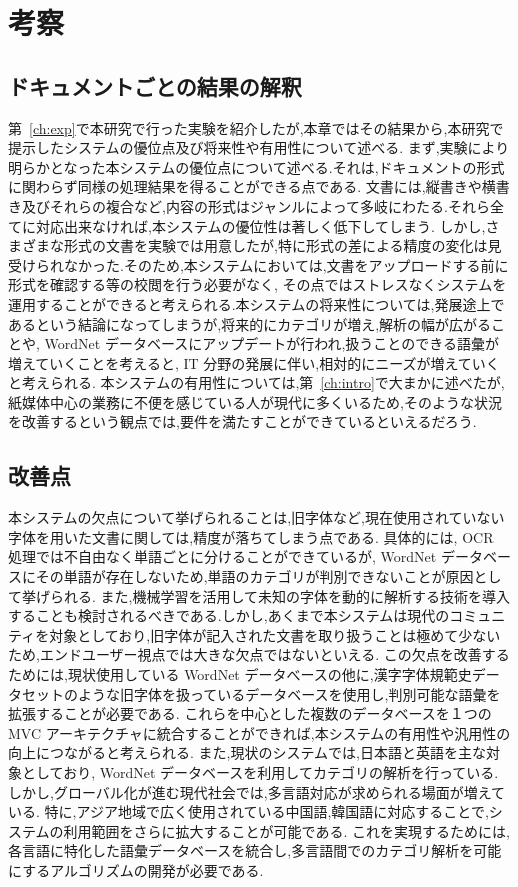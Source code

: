 \chapter{考察}
\label{ch:eval}

\quad

\section{ドキュメントごとの結果の解釈}
\label{sec:eval_docs}

第~\ref{ch:exp}で本研究で行った実験を紹介したが,本章ではその結果から,本研究で提示したシステムの優位点及び将来性や有用性について述べる.
まず,実験により明らかとなった本システムの優位点について述べる.それは,ドキュメントの形式に関わらず同様の処理結果を得ることができる点である.
文書には,縦書きや横書き及びそれらの複合など,内容の形式はジャンルによって多岐にわたる.それら全てに対応出来なければ,本システムの優位性は著しく低下してしまう.
しかし,さまざまな形式の文書を実験では用意したが,特に形式の差による精度の変化は見受けられなかった.そのため,本システムにおいては,文書をアップロードする前に形式を確認する等の校閲を行う必要がなく,
その点ではストレスなくシステムを運用することができると考えられる.本システムの将来性については,発展途上であるという結論になってしまうが,将来的にカテゴリが増え,解析の幅が広がることや,
WordNet データベースにアップデートが行われ,扱うことのできる語彙が増えていくことを考えると, IT 分野の発展に伴い,相対的にニーズが増えていくと考えられる.
本システムの有用性については,第~\ref{ch:intro}で大まかに述べたが,紙媒体中心の業務に不便を感じている人が現代に多くいるため,そのような状況を改善するという観点では,要件を満たすことができているといえるだろう.

\section{改善点}
\label{sec:eval_improve}
本システムの欠点について挙げられることは,旧字体など,現在使用されていない字体を用いた文書に関しては,精度が落ちてしまう点である.
具体的には, OCR 処理では不自由なく単語ごとに分けることができているが, WordNet データベースにその単語が存在しないため,単語のカテゴリが判別できないことが原因として挙げられる.
また,機械学習を活用して未知の字体を動的に解析する技術を導入することも検討されるべきである.しかし,あくまで本システムは現代のコミュニティを対象としており,旧字体が記入された文書を取り扱うことは極めて少ないため,エンドユーザー視点では大きな欠点ではないといえる.
この欠点を改善するためには,現状使用している WordNet データべースの他に,漢字字体規範史データセットのような旧字体を扱っているデータベースを使用し,判別可能な語彙を拡張することが必要である.
これらを中心とした複数のデータベースを１つの MVC アーキテクチャに統合することができれば,本システムの有用性や汎用性の向上につながると考えられる.
また,現状のシステムでは,日本語と英語を主な対象としており, WordNet データベースを利用してカテゴリの解析を行っている.しかし,グローバル化が進む現代社会では,多言語対応が求められる場面が増えている.
特に,アジア地域で広く使用されている中国語,韓国語に対応することで,システムの利用範囲をさらに拡大することが可能である.
これを実現するためには,各言語に特化した語彙データベースを統合し,多言語間でのカテゴリ解析を可能にするアルゴリズムの開発が必要である.
